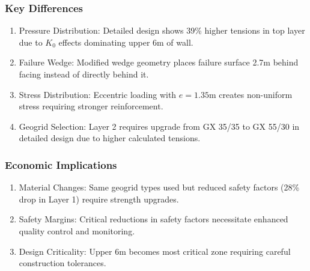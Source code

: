\documentclass[10pt,a4paper,twocolumn]{article}
\begin{document}
\subsubsection{Key Differences}
\begin{enumerate}
  
\item {Pressure Distribution:} Detailed design shows 39\% higher tensions in top layer due to $K_0$ effects dominating upper 6m of wall.

\item {Failure Wedge:} Modified wedge geometry places failure surface 2.7m behind facing instead of directly behind it.

\item {Stress Distribution:} Eccentric loading with $e=1.35$m creates non-uniform stress requiring stronger reinforcement.

\item {Geogrid Selection:} Layer 2 requires upgrade from GX 35/35 to GX 55/30 in detailed design due to higher calculated tensions.
\end{enumerate}

\subsubsection{Economic Implications}
\begin{enumerate}
   
 \item {Material Changes:} Same geogrid types used but reduced safety factors (28\% drop in Layer 1) require strength upgrades.

 \item {Safety Margins:} Critical reductions in safety factors necessitate enhanced quality control and monitoring.

 \item {Design Criticality:} Upper 6m becomes most critical zone requiring careful construction tolerances.
\end{enumerate}
\end{document}
